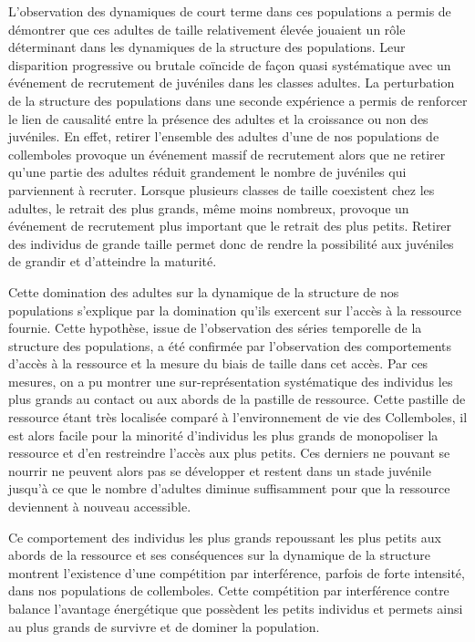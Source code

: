 L'observation des dynamiques de court terme dans ces populations a permis de
démontrer que ces adultes de taille relativement élevée jouaient un rôle
déterminant dans les dynamiques de la structure des populations. Leur
disparition progressive ou brutale coïncide de façon quasi systématique avec un
événement de recrutement de juvéniles dans les classes adultes. La perturbation
de la structure des populations dans une seconde expérience a permis de
renforcer le lien de causalité entre la présence des adultes et la croissance ou
non des juvéniles. En effet, retirer l'ensemble des adultes d'une de nos
populations de collemboles provoque un événement massif de recrutement alors que
ne retirer qu'une partie des adultes réduit
grandement le nombre de juvéniles qui parviennent à recruter. Lorsque plusieurs
classes de taille coexistent chez les adultes, le retrait des plus grands, même
moins nombreux, provoque un événement de recrutement plus important que le
retrait des plus petits. Retirer des individus de grande taille permet donc de
rendre la possibilité aux juvéniles de grandir et d'atteindre la maturité.

Cette domination des adultes sur la dynamique de la structure de nos populations
s'explique par la domination qu'ils exercent sur l'accès à la ressource fournie.
Cette hypothèse, issue de l'observation des séries temporelle de la structure
des populations, a été confirmée par l'observation des comportements d'accès à
la ressource et la mesure du biais de taille dans cet accès. Par ces mesures, on
a pu montrer une sur-représentation systématique des individus les plus grands
au contact ou aux abords de la pastille de ressource. Cette pastille de
ressource étant très localisée comparé à l'environnement de vie des Collemboles,
il est alors facile pour la minorité d'individus les plus grands de monopoliser
la ressource et d'en restreindre l'accès aux plus petits. Ces derniers ne
pouvant se nourrir ne peuvent alors pas se développer et restent dans un stade
juvénile jusqu'à ce que le nombre d'adultes diminue suffisamment pour que la
ressource deviennent à nouveau accessible. 

Ce comportement des individus les plus grands repoussant les plus petits aux
abords de la ressource et ses conséquences sur la dynamique de la structure
montrent l'existence d'une compétition par interférence, parfois de forte
intensité, dans nos populations de collemboles. Cette compétition par
interférence contre balance l'avantage énergétique que possèdent les petits
individus et permets ainsi au plus grands de survivre et de dominer la
population. 

